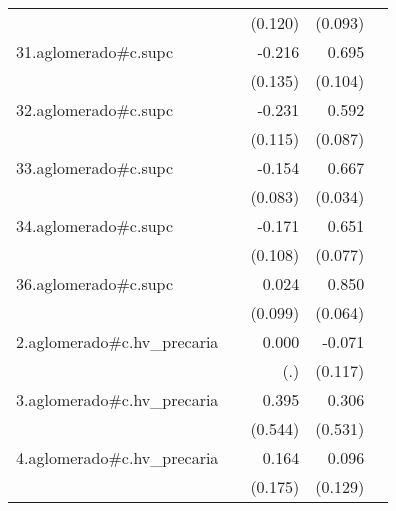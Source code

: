 {\begin{longtable}{l*{4}{D{.}{.}{-1}}}
            &                     &     (0.120)         &     (0.093)         &                     \\
\addlinespace
31.aglomerado#c.supc&                     &      -0.216         &       0.695\sym{***}&                     \\
            &                     &     (0.135)         &     (0.104)         &                     \\
\addlinespace
32.aglomerado#c.supc&                     &      -0.231\sym{*}  &       0.592\sym{***}&                     \\
            &                     &     (0.115)         &     (0.087)         &                     \\
\addlinespace
33.aglomerado#c.supc&                     &      -0.154         &       0.667\sym{***}&                     \\
            &                     &     (0.083)         &     (0.034)         &                     \\
\addlinespace
34.aglomerado#c.supc&                     &      -0.171         &       0.651\sym{***}&                     \\
            &                     &     (0.108)         &     (0.077)         &                     \\
\addlinespace
36.aglomerado#c.supc&                     &       0.024         &       0.850\sym{***}&                     \\
            &                     &     (0.099)         &     (0.064)         &                     \\
\addlinespace
2.aglomerado#c.hv\_precaria&                     &       0.000         &      -0.071         &                     \\
            &                     &         (.)         &     (0.117)         &                     \\
\addlinespace
3.aglomerado#c.hv\_precaria&                     &       0.395         &       0.306         &                     \\
            &                     &     (0.544)         &     (0.531)         &                     \\
\addlinespace
4.aglomerado#c.hv\_precaria&                     &       0.164         &       0.096         &                     \\
            &                     &     (0.175)         &     (0.129)         &                     \\

\end{longtable}}
